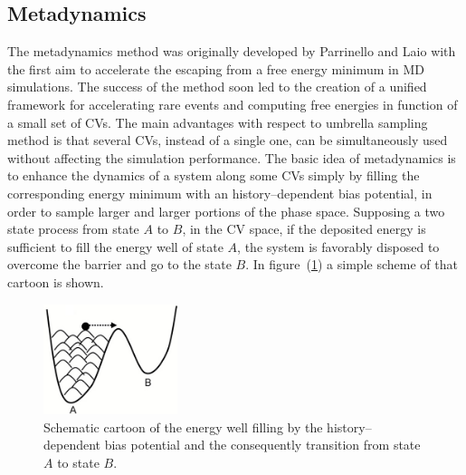 \subsection{Metadynamics}
\label{sec:metadynamics}
The metadynamics method was originally developed by Parrinello and Laio \cite{MetadParrinello} with the first aim
to accelerate the escaping from a free energy minimum in \ac{MD} simulations. The success of the method soon led
to the creation of a unified framework for accelerating rare events and computing free energies in function of a
small set of \acp{CV}. The main advantages with respect to umbrella sampling method is that several \acp{CV},
instead of a single one, can be simultaneously used without affecting the simulation performance. The basic idea
of metadynamics is to enhance the dynamics of a system along some \acp{CV} simply by filling the corresponding
energy minimum with an history--dependent bias potential, in order to sample larger and larger portions of the
phase space. Supposing a two state process from state $A$ to $B$, in the \ac{CV} space, if the deposited energy
is sufficient to fill the energy well of state $A$, the system is favorably disposed to overcome the barrier and 
go to the state $B$. In figure~(\ref{fig:fancyMetadyn}) a simple scheme of that cartoon is shown. 
\begin{figure}
	\includegraphics[width=0.35\textwidth]{./img/fancyMetadyn}
	\caption{Schematic cartoon of the energy well filling by the history--dependent bias potential and the consequently transition from state $A$ to state $B$.}
	\label{fig:fancyMetadyn}
\end{figure}

